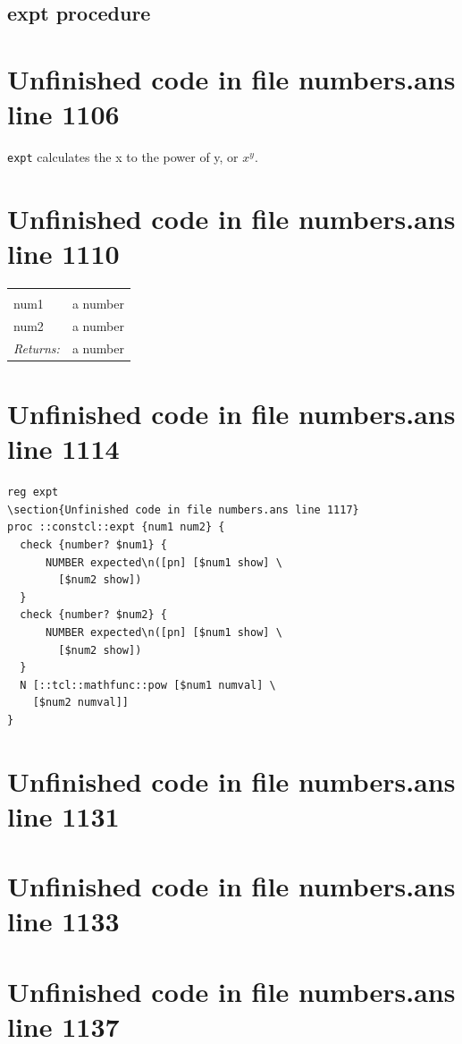 \documentclass[twoside,9pt]{report}
\begin{document}
\subsection{expt procedure}
\label{expt-procedure}
\section{Unfinished code in file numbers.ans line 1106}


\texttt{expt} calculates the x to the power of y, or ${x}^{y}$.

\section{Unfinished code in file numbers.ans line 1110}
\noindent\begin{tabular}{ |p{1.9cm} p{8cm}| }
\hline
\rowcolor[HTML]{CCCCCC} \multicolumn{2}{|l|}{\bf expt (public)} \\
num1 & a number \\
num2 & a number \\
\textit{Returns:} & a number \\
\hline
\end{tabular}
\section{Unfinished code in file numbers.ans line 1114}
\begin{lstlisting}
reg expt
\section{Unfinished code in file numbers.ans line 1117}
proc ::constcl::expt {num1 num2} {
  check {number? $num1} {
      NUMBER expected\n([pn] [$num1 show] \
        [$num2 show])
  }
  check {number? $num2} {
      NUMBER expected\n([pn] [$num1 show] \
        [$num2 show])
  }
  N [::tcl::mathfunc::pow [$num1 numval] \
    [$num2 numval]]
}
\end{lstlisting}
\section{Unfinished code in file numbers.ans line 1131}
\section{Unfinished code in file numbers.ans line 1133}
\section{Unfinished code in file numbers.ans line 1137}
\end{document}
